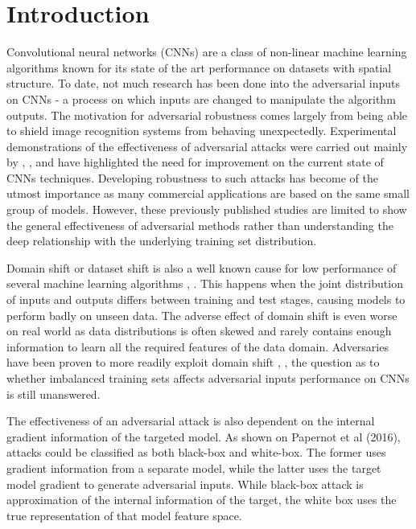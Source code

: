 \documentclass[runningheads,a4paper]{llncs}
\begin{document}
\section{Introduction}


Convolutional neural networks (CNNs) are a class of non-linear machine learning algorithms known for its state of the art performance on datasets with spatial structure. To date, not much research has been done into the adversarial inputs on CNNs - a process on which inputs are changed to manipulate the algorithm outputs. The motivation for adversarial robustness comes largely from being able to shield image recognition systems from behaving unexpectedly. Experimental demonstrations of the effectiveness of adversarial attacks were carried out mainly by \cite{billovits}, \cite{goodfellow2014}, \cite{papernot2016} and have highlighted the need for improvement on the current state of CNNs techniques. Developing robustness to such attacks has become of the utmost importance as many commercial applications are based on the same small group of models. However, these previously published studies are limited to show the general effectiveness of adversarial methods rather than understanding the deep relationship with the underlying training set distribution.  

Domain shift or dataset shift \cite{Quionero} is also a well known cause for low performance of several machine learning algorithms \cite{japkowicz2002class}, \cite{krawczyk2016learning}. This happens when the joint distribution of inputs and outputs differs between training and test stages, causing models to perform badly on unseen data. The adverse effect of domain shift is even worse on real world as data distributions is often skewed and rarely contains enough information to learn all the required features of the data domain. Adversaries have been proven to more readily exploit domain shift \cite{lowd2005}, \cite{Laskov2010}, the question as to whether imbalanced training sets affects adversarial inputs performance on CNNs is still unanswered. 

The effectiveness of an adversarial attack is also dependent on the internal gradient information of the targeted model. As shown on Papernot et al (2016), attacks could be classified as both black-box and white-box. The former uses gradient information from a separate model, while the latter uses the target model gradient to generate adversarial inputs. While black-box attack is approximation of the internal information of the target, the white box uses the true representation of that model feature space.
\end{document}
